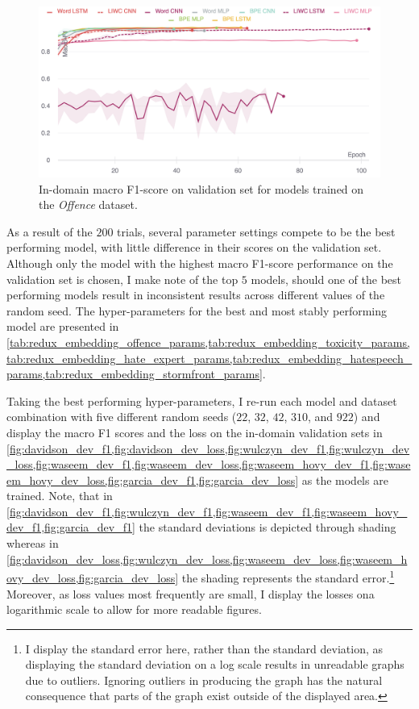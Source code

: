 \begin{figure}
    \centering
    \includegraphics[width=\textwidth]{davidson_dev_f1.pdf}
    \caption{In-domain macro F1-score on validation set for models trained on the \textit{Offence} dataset.}
    \label{fig:davidson_dev_f1}
\end{figure}
As a result of the $200$ trials, several parameter settings compete to be the best performing model, with little difference in their scores on the validation set. Although only the model with the highest macro F1-score performance on the validation set is chosen, I make note of the top $5$ models, should one of the best performing models result in inconsistent results across different values of the random seed. The hyper-parameters for the best and most stably performing model are presented in \cref{tab:redux_embedding_offence_params,tab:redux_embedding_toxicity_params,tab:redux_embedding_hate_expert_params,tab:redux_embedding_hatespeech_params,tab:redux_embedding_stormfront_params}.

Taking the best performing hyper-parameters, I re-run each model and dataset combination with five different random seeds ($22$, $32$, $42$, $310$, and $922$) and display the macro F1 scores and the loss on the in-domain validation sets in \cref{fig:davidson_dev_f1,fig:davidson_dev_loss,fig:wulczyn_dev_f1,fig:wulczyn_dev_loss,fig:waseem_dev_f1,fig:waseem_dev_loss,fig:waseem_hovy_dev_f1,fig:waseem_hovy_dev_loss,fig:garcia_dev_f1,fig:garcia_dev_loss} as the models are trained.
Note, that in \cref{fig:davidson_dev_f1,fig:wulczyn_dev_f1,fig:waseem_dev_f1,fig:waseem_hovy_dev_f1,fig:garcia_dev_f1} the standard deviations is depicted through shading whereas in \cref{fig:davidson_dev_loss,fig:wulczyn_dev_loss,fig:waseem_dev_loss,fig:waseem_hovy_dev_loss,fig:garcia_dev_loss} the shading represents the standard error.\footnote{I display the standard error here, rather than the standard deviation, as displaying the standard deviation on a log scale results in unreadable graphs due to outliers. Ignoring outliers in producing the graph has the natural consequence that parts of the graph exist outside of the displayed area.}
Moreover, as loss values most frequently are small, I display the losses ona  logarithmic scale to allow for more readable figures.\vspace{5mm}


